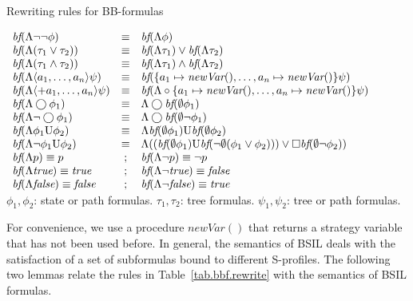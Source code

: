 \documentclass[11pt]{article}
\newcommand{\embf}{\textit{bf}}
\newcommand{\emnewv}{\textit{newVar}}
\newcommand{\true}{\mbox{\em true}}
\newcommand{\false}{\mbox{\em false}}
\newcommand{\pfrr}{\Box}
\newcommand{\until}{\textrm{U}} %
\newcommand{\nxt}{\bigcirc}
\begin{document}
\begin{table*}[t!]
\caption{Rewriting rules for BB-formulas}
\label{tab.bbf.rewrite}
\begin{center}
$\begin{array}{lcl} 
\embf(\Lambda\neg\neg\phi) 
& \equiv & \embf(\Lambda\phi)\\
\embf(\Lambda(\tau_1\vee\tau_2)) 
& \equiv & \embf(\Lambda \tau_1)\vee\embf(\Lambda \tau_2)\\
\embf(\Lambda(\tau_1\wedge\tau_2)) 
& \equiv & \embf(\Lambda\tau_1)\wedge\embf(\Lambda\tau_2)\\
\embf(\Lambda \langle a_1,\ldots,a_n\rangle\psi) 
& \equiv & \embf(\{a_1\mapsto \emnewv(), \ldots, a_n\mapsto \emnewv()\}\psi)\\
\embf(\Lambda \langle+ a_1,\ldots,a_n\rangle\psi) 
& \equiv & \embf(\Lambda\circ\{a_1\mapsto \emnewv(), \ldots, a_n\mapsto \emnewv()\}\psi)\\
\embf(\Lambda \nxt\phi_1) 
& \equiv & \Lambda\nxt\embf(\emptyset\phi_1)\\
\embf(\Lambda \neg\nxt\phi_1) 
& \equiv & \Lambda\nxt\embf(\emptyset\neg\phi_1)\\
\embf(\Lambda \phi_1\until\phi_2) 
& \equiv & \Lambda\embf(\emptyset\phi_1)\until\embf(\emptyset\phi_2)\\
\embf(\Lambda \neg\phi_1\until\phi_2) 
& \equiv & \Lambda((\embf(\emptyset\phi_1)
	\until\embf(\neg\emptyset(\phi_1\vee\phi_2)))
           \vee \pfrr\embf(\emptyset\neg\phi_2))\\
\embf(\Lambda p) \equiv p 
&;  & \embf(\Lambda \neg p) \equiv \neg p\\
\embf(\Lambda \true) \equiv \true
&;  & \embf(\Lambda \neg\true) \equiv \false\\
\embf(\Lambda \false) \equiv \false
&;  & \embf(\Lambda \neg\false) \equiv \true\\
\end{array}$\\
$\phi_1,\phi_2$: state or path formulas.  
$\tau_1,\tau_2$: tree formulas.
$\psi_1,\psi_2$: tree or path formulas.
\end{center} 
\end{table*}
For convenience, we use a procedure $\emnewv()$ that returns a
strategy variable that has not been used before.  
In general, the semantics of BSIL deals with the satisfaction 
of a set of subformulas bound to different S-profiles.  
The following two lemmas relate the 
rules in Table~\ref{tab.bbf.rewrite} 
with the semantics of BSIL formulas.  
\end{document}
